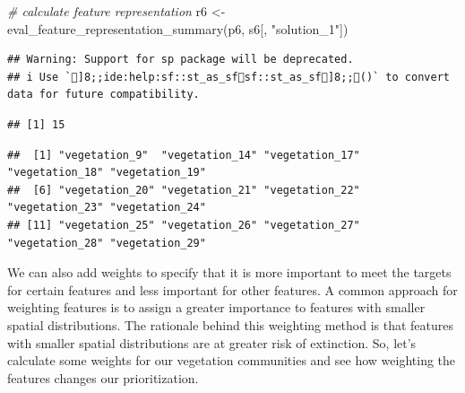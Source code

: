 \documentclass[
  12pt,
]{book}
\newenvironment{Shaded}{\begin{snugshade}}{\end{snugshade}}
\newcommand{\AttributeTok}[1]{\textcolor[rgb]{0.77,0.63,0.00}{#1}}
\newcommand{\CommentTok}[1]{\textcolor[rgb]{0.56,0.35,0.01}{\textit{#1}}}
\newcommand{\ConstantTok}[1]{\textcolor[rgb]{0.00,0.00,0.00}{#1}}
\newcommand{\FloatTok}[1]{\textcolor[rgb]{0.00,0.00,0.81}{#1}}
\newcommand{\FunctionTok}[1]{\textcolor[rgb]{0.00,0.00,0.00}{#1}}
\newcommand{\NormalTok}[1]{#1}
\newcommand{\OtherTok}[1]{\textcolor[rgb]{0.56,0.35,0.01}{#1}}
\newcommand{\SpecialCharTok}[1]{\textcolor[rgb]{0.00,0.00,0.00}{#1}}
\newcommand{\StringTok}[1]{\textcolor[rgb]{0.31,0.60,0.02}{#1}}
\begin{document}
\begin{Shaded}
\begin{Highlighting}[]
\CommentTok{\# calculate feature representation}
\NormalTok{r6 }\OtherTok{\textless{}{-}} \FunctionTok{eval\_feature\_representation\_summary}\NormalTok{(p6, s6[, }\StringTok{"solution\_1"}\NormalTok{])}
\end{Highlighting}
\end{Shaded}

\begin{verbatim}
## Warning: Support for sp package will be deprecated.
## i Use `]8;;ide:help:sf::st_as_sfsf::st_as_sf]8;;()` to convert data for future compatibility.
\end{verbatim}

\begin{Shaded}
\end{Shaded}

\begin{verbatim}
## [1] 15
\end{verbatim}

\begin{Shaded}
\end{Shaded}

\begin{verbatim}
##  [1] "vegetation_9"  "vegetation_14" "vegetation_17" "vegetation_18" "vegetation_19"
##  [6] "vegetation_20" "vegetation_21" "vegetation_22" "vegetation_23" "vegetation_24"
## [11] "vegetation_25" "vegetation_26" "vegetation_27" "vegetation_28" "vegetation_29"
\end{verbatim}

We can also add weights to specify that it is more important to meet the targets for certain features and less important for other features. A common approach for weighting features is to assign a greater importance to features with smaller spatial distributions. The rationale behind this weighting method is that features with smaller spatial distributions are at greater risk of extinction. So, let's calculate some weights for our vegetation communities and see how weighting the features changes our prioritization.
\end{document}
